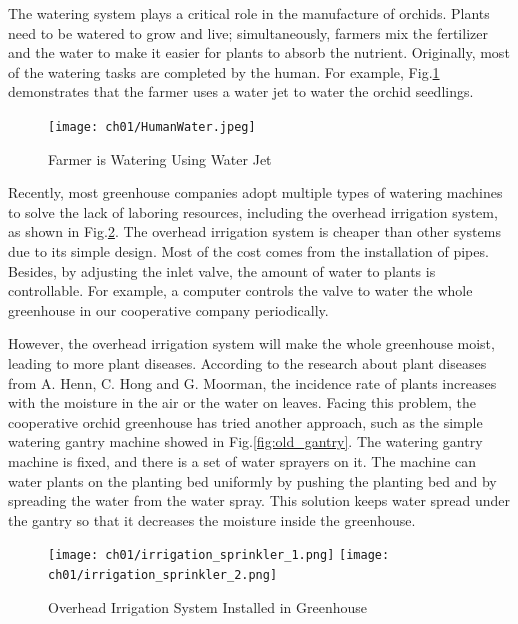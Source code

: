 The watering system plays a critical role in the manufacture of orchids. Plants need to be watered to grow and live; simultaneously, farmers mix the fertilizer and the water to make it easier for plants to absorb the nutrient. Originally, most of the watering tasks are completed by the human. For example, Fig.\ref{fig:HumanWater} demonstrates that the farmer uses a water jet to water the orchid seedlings.

\begin{figure}[ht]
    \centering
    \texttt{[image: ch01/HumanWater.jpeg]}
    \caption{Farmer is Watering Using Water Jet}
    \label{fig:HumanWater}
\end{figure}


Recently, most greenhouse companies adopt multiple types of watering machines to solve the lack of laboring resources, including the overhead irrigation system, as shown in Fig.\ref{fig:irrigation_sprinkler}. The overhead irrigation system is cheaper than other systems due to its simple design. Most of the cost comes from the installation of pipes. Besides, by adjusting the inlet valve, the amount of water to plants is controllable. For example, a computer controls the valve to water the whole greenhouse in our cooperative company periodically.

However, the overhead irrigation system will make the whole greenhouse moist, leading to more plant diseases. According to the research about plant diseases from A. Henn, C. Hong and G. Moorman\cite{henn_2016, Plant_Pathogens}, the incidence rate of plants increases with the moisture in the air or the water on leaves. Facing this problem, the cooperative orchid greenhouse has tried another approach, such as the simple watering gantry machine showed in Fig.\ref{fig:old_gantry}. The watering gantry machine is fixed, and there is a set of water sprayers on it. The machine can water plants on the planting bed uniformly by pushing the planting bed and by spreading the water from the water spray. This solution keeps water spread under the gantry so that it decreases the moisture inside the greenhouse.

\begin{figure}[ht]
    \centering
    \texttt{[image: ch01/irrigation\_sprinkler\_1.png]}
    \texttt{[image: ch01/irrigation\_sprinkler\_2.png]}
    \caption{Overhead Irrigation System Installed in Greenhouse}
    \label{fig:irrigation_sprinkler}
\end{figure}


